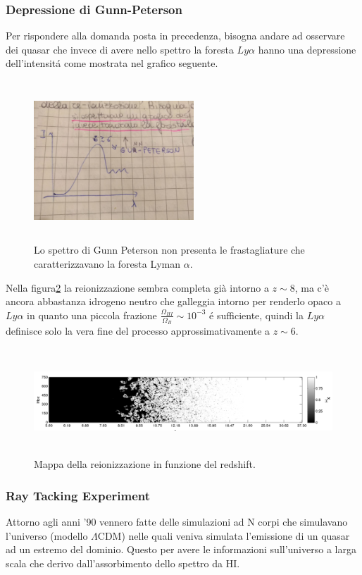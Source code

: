 \documentclass[12pt, a4paper]{article}
\begin{document}
\subsubsection{Depressione di Gunn-Peterson }
Per rispondere alla domanda posta in precedenza, bisogna andare ad osservare dei quasar che invece di avere nello spettro la foresta $Ly\alpha$ hanno una depressione dell'intensit\'{a} come mostrata nel grafico seguente.
\begin{figure}[htp]
\centering
\includegraphics[width=6cm, height=6cm]{images/GunnPeterson.jpeg}
\caption{Lo spettro di Gunn Peterson non presenta le frastagliature che caratterizzavano la foresta Lyman $\alpha$.}
\label{fig:GunnPeterson}
\end{figure}
Nella figura\ref{fig:reioniz} la reionizzazione sembra completa già intorno a $z\sim8$, ma c'è ancora abbastanza idrogeno neutro che galleggia intorno per renderlo opaco a $Ly\alpha$ in quanto una piccola frazione $\frac{\Omega_{HI}}{\Omega_B}\sim 10^{-3}$ \'{e} sufficiente, quindi la $Ly\alpha$ definisce solo la vera fine del processo approssimativamente a $z\sim6$.\\
\begin{figure}[htp]
\centering
\includegraphics[width=17cm, height=4cm]{images/reioniz.png}
\caption{Mappa della reionizzazione in funzione del redshift.}
\label{fig:reioniz}
\end{figure}
\subsubsection{Ray Tacking Experiment}
Attorno agli anni '90 vennero fatte delle simulazioni ad N corpi  che simulavano l'universo (modello $\Lambda$CDM) nelle quali veniva simulata l'emissione di un quasar ad un estremo del dominio. Questo per avere le informazioni sull'universo a larga scala che derivo dall'assorbimento dello spettro da HI.
\end{document}
